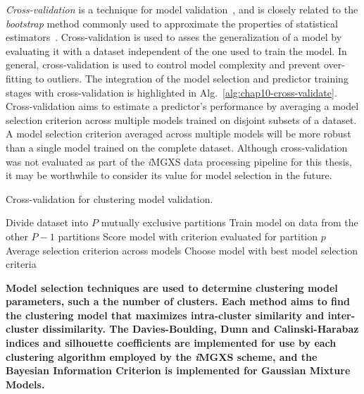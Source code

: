 \textit{Cross-validation} is a technique for model validation~\cite{kohavi1995cv}, and is closely related to the \textit{bootstrap} method commonly used to approximate the properties of statistical estimators~\cite{efron1994bootstrap}. Cross-validation is used to asses the generalization of a model by evaluating it with a dataset independent of the one used to train the model. In general, cross-validation is used to control model complexity and prevent over-fitting to outliers. The integration of the model selection and predictor training stages with cross-validation is highlighted in Alg.~\ref{alg:chap10-cross-validate}. Cross-validation aims to estimate a predictor's performance by averaging a model selection criterion across multiple models trained on disjoint subsets of a dataset. A model selection criterion averaged across multiple models will be more robust than a single model trained on the complete dataset. Although cross-validation was not evaluated as part of the \textit{i}\ac{MGXS} data processing pipeline for this thesis, it may be worthwhile to consider its value for model selection in the future.

\begin{algorithm}[h!]
\caption[Cross-Validation]{Cross-validation for clustering model validation.}
\label{alg:chap10-cross-validate}
\begin{algorithmic}[1]
  \State Divide dataset into $P$ mutually exclusive partitions
      \State Train model on data from the other $P-1$ partitions
      \State Score model with criterion evaluated for partition $p$ 
    \EndFor
    \State Average selection criterion across models
  \EndFor
  \State Choose model with best model selection criteria
\end{algorithmic}
\end{algorithm}

\begin{emphbox}
\textbf{Model selection techniques are used to determine clustering model parameters, such a the number of clusters. Each method aims to find the clustering model that maximizes intra-cluster similarity and inter-cluster dissimilarity. The Davies-Boulding, Dunn and Calinski-Harabaz indices and silhouette coefficients are implemented for use by each clustering algorithm employed by the \textit{i}\ac{MGXS} scheme, and the Bayesian Information Criterion is implemented for Gaussian Mixture Models.}
\end{emphbox}

